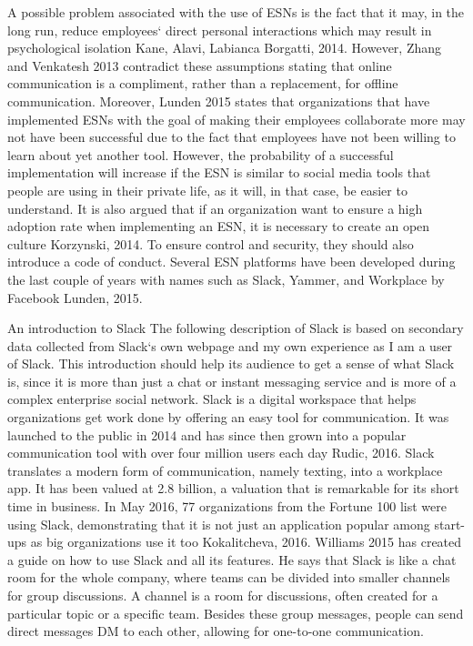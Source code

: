 A possible problem associated with the use of ESNs is the fact that it may, in the long run, reduce employees‘ direct personal interactions which may result in psychological isolation Kane, Alavi, Labianca  Borgatti, 2014. However, Zhang and Venkatesh 2013 contradict these assumptions stating that online communication is a compliment, rather than a replacement, for offline communication. 
Moreover, Lunden 2015 states that organizations that have implemented ESNs with the goal of making their employees collaborate more may not have been successful due to the fact that employees have not been willing to learn about yet another tool. However, the probability of a successful implementation will increase if the ESN is similar to social media tools that people are using in their private life, as it will, in that case, be easier to understand. It is also argued that if an organization want to ensure a high adoption rate when implementing an ESN, it is necessary to create an open culture Korzynski, 2014. To ensure control and security, they should also introduce a code of conduct. Several ESN platforms have been developed during the last couple of years with names such as Slack, Yammer, and Workplace by Facebook Lunden, 2015.

An introduction to Slack
The following description of Slack is based on secondary data collected from Slack‘s own webpage and my own experience as I am a user of Slack. This introduction should help its audience to get a sense of what Slack is, since it is more than just a chat or instant messaging service and is more of a complex enterprise social network.
Slack is a digital workspace that helps organizations get work done by offering an easy tool for communication. It was launched to the public in 2014 and has since then grown into a popular communication tool with over four million users each day Rudic, 2016. Slack translates a modern form of communication, namely texting, into a workplace app. It has been valued at 2.8 billion, a valuation that is remarkable for its short time in business. In May 2016, 77 organizations from the Fortune 100 list were using Slack, demonstrating that it is not just an application popular among start-ups as big organizations use it too Kokalitcheva, 2016. Williams 2015 has created a guide on how to use Slack and all its features. He says that Slack is like a chat room for the whole company, where teams can be divided into smaller channels for group discussions. A channel is a room for discussions, often created for a particular topic or a specific team. Besides these group messages, people can send direct messages DM to each other, allowing for one-to-one communication.

